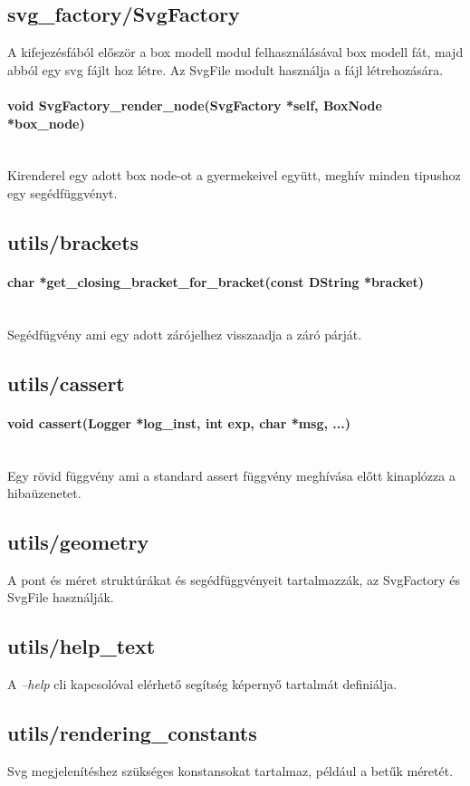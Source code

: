 \documentclass{article}[12pt,a4paper]
\newcommand{\lang}[1]{\textit{#1}}
\newcommand{\fn}[1]{\paragraph{#1}\mbox{}\\}
\begin{document}
    \subsection{svg\_factory/SvgFactory}
    A kifejezésfából először a box modell modul felhasználásával box modell fát, majd abból egy svg fájlt hoz létre.
    Az SvgFile modult használja a fájl létrehozására.

    \fn{void SvgFactory\_render\_node(SvgFactory *self, BoxNode *box\_node)}
    Kirenderel egy adott box node-ot a gyermekeivel együtt, meghív minden tipushoz egy segédfüggvényt.

    \subsection{utils/brackets}

    \fn{char *get\_closing\_bracket\_for\_bracket(const DString *bracket)}
    Segédfügvény ami egy adott zárójelhez visszaadja a záró párját.

    \subsection{utils/cassert}

    \fn{void cassert(Logger *log\_inst, int exp, char *msg, ...)}
    Egy rövid függvény ami a standard assert függvény meghívása előtt kinaplózza a hibaüzenetet.

    \subsection{utils/geometry}
    A pont és méret struktúrákat és segédfüggvényeit tartalmazzák, az SvgFactory és SvgFile használják.

    \subsection{utils/help\_text}
    A \lang{--help} cli kapcsolóval elérhető segítség képernyő tartalmát definiálja.

    \subsection{utils/rendering\_constants}
    Svg megjelenítéshez szükséges konstansokat tartalmaz, például a betűk méretét.
\end{document}
